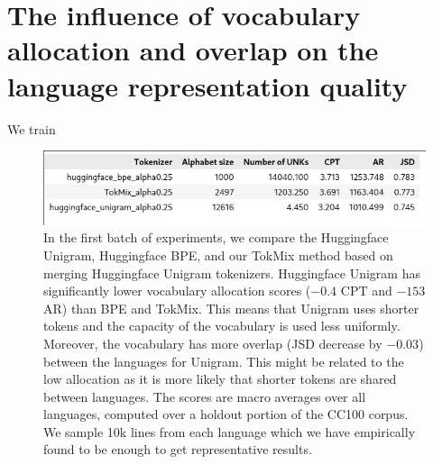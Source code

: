\section{The influence of vocabulary allocation and overlap on the language representation quality}

We train 



\begin{figure}[H]
    \centering
    \includegraphics[width=\textwidth]{img/temp/20l_metrics.png}
    \caption{In the first batch of experiments, we compare the Huggingface Unigram, Huggingface BPE, and our TokMix method based on merging Huggingface Unigram tokenizers. Huggingface Unigram has significantly lower vocabulary allocation scores ($-0.4$ CPT and $-153$ AR) than BPE and TokMix. This means that Unigram uses shorter tokens and the capacity of the vocabulary is used less uniformly. Moreover, the vocabulary has more overlap (JSD decrease by $-0.03$) between the languages for Unigram. This might be related to the low allocation as it is more likely that shorter tokens are shared between languages. The scores are macro averages over all languages, computed over a holdout portion of the CC100 corpus. We sample 10k lines from each language which we have empirically found to be enough to get representative results.}
    \label{fig:20l_metrics}
\end{figure}


